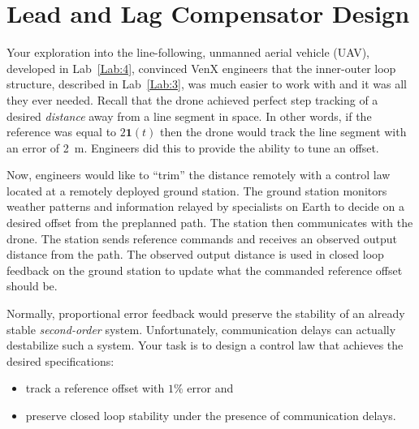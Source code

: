 \chapter{Lead and Lag Compensator Design}\label{Lab:5}
Your exploration into the line-following, unmanned aerial vehicle (UAV), developed in Lab~\ref{Lab:4}, convinced VenX engineers that the inner-outer loop structure, described in Lab~\ref{Lab:3}, was much easier to work with and it was all they ever needed.
Recall that the drone achieved perfect step tracking of a desired \emph{distance} away from a line segment in space.
In other words, if the reference was equal to \(2\mathbf{1}(t)\) then the drone would track the line segment with an error of \SI{2}{\meter}.
Engineers did this to provide the ability to tune an offset.
%
\begin{center}
  
\end{center}
%
Now, engineers would like to ``trim'' the distance remotely with a control law located at a remotely deployed ground station.
The ground station monitors weather patterns and information relayed by specialists on Earth to decide on a desired offset from the preplanned path.
The station then communicates with the drone.
The station sends reference commands and receives an observed output distance from the path.
The observed output distance is used in closed loop feedback on the ground station to update what the commanded reference offset should be.

Normally, proportional error feedback would preserve the stability of an already stable \emph{second-order} system.
Unfortunately, communication delays can actually destabilize such a system.
Your task is to design a control law that achieves the desired specifications:
\begin{itemize}
  \item{track a reference offset with \(1\%\) error and}
  \item{preserve closed loop stability under the presence of communication delays.}
\end{itemize}


